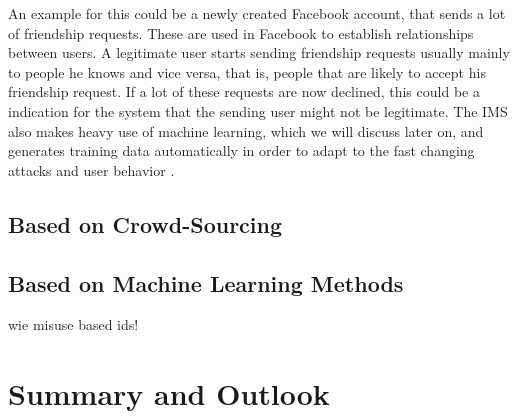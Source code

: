 An example for this could be a newly created Facebook account, that sends a lot of friendship requests. These are used in Facebook to establish relationships between users. A legitimate user starts sending friendship requests usually mainly to people he knows and vice versa, that is, people that are likely to accept his friendship request. If a lot of these requests are now declined, this could be a indication for the system that the sending user might not be legitimate.  The IMS also makes heavy use of machine learning, which we will discuss later on, and generates training data automatically in order to adapt to the fast changing attacks and user behavior \cite{fis}.

\subsection{Based on Crowd-Sourcing}


\subsection{Based on Machine Learning Methods}
wie misuse based ids!

\section{Summary and Outlook}


























\newpage